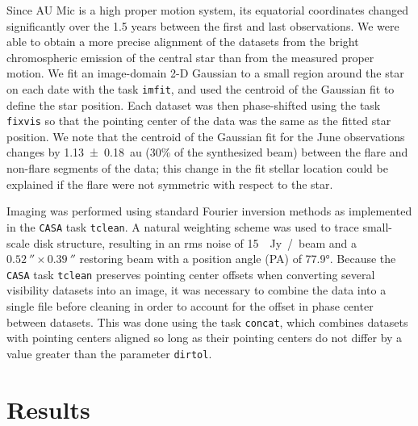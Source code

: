 \documentclass[modern]{aastex62}
\begin{document}
Since AU Mic is a high proper motion system, its equatorial coordinates changed significantly over the 1.5 years between the first and last observations.  
We were able to obtain a more precise alignment of the datasets from the bright chromospheric emission of the central star than from the measured proper motion.
We fit an image-domain 2-D Gaussian to a small region around the star on each date with the task \texttt{imfit}, and used the centroid of the Gaussian fit to define the star position.
Each dataset was then phase-shifted using the task \texttt{fixvis} so that the pointing center of the data was the same as the fitted star position.
We note that the centroid of the Gaussian fit for the June observations changes by \SI{1.13 \pm 0.18}{au} (30\% of the synthesized beam) between the flare and non-flare segments of the data; this change in the fit stellar location could be explained if the flare were not symmetric with respect to the star.

Imaging was performed using standard Fourier inversion methods as implemented in the \texttt{CASA} task \texttt{tclean}. 
A natural weighting scheme was used to trace small-scale disk structure, resulting in an rms noise of \SI{15}{\mu Jy / beam} and a $\SI{0.52}{\arcsecond} \times \SI{0.39}{\arcsecond}$ restoring beam with a position angle (PA) of \ang[angle-symbol-over-decimal]{77.9}. 
Because the \texttt{CASA} task \texttt{tclean} preserves pointing center offsets when converting several visibility datasets into an image, it was necessary to combine the data into a single file before cleaning in order to account for the offset in phase center between datasets. 
This was done using the task \texttt{concat}, which combines datasets with pointing centers aligned so long as their pointing centers do not differ by a value greater than the parameter \texttt{dirtol}.

\section{Results}
\label{section: results}
\end{document}
